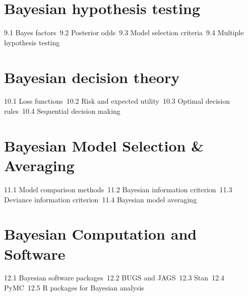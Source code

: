 \section{Bayesian hypothesis testing}
9.1 Bayes factors\
9.2 Posterior odds\
9.3 Model selection criteria\
9.4 Multiple hypothesis testing\
\section{Bayesian decision theory}
10.1 Loss functions\
10.2 Risk and expected utility\
10.3 Optimal decision rules\
10.4 Sequential decision making\
\section{Bayesian Model Selection \& Averaging}
11.1 Model comparison methods\
11.2 Bayesian information criterion\
11.3 Deviance information criterion\
11.4 Bayesian model averaging\
\section{Bayesian Computation and Software}
12.1 Bayesian software packages\
12.2 BUGS and JAGS\
12.3 Stan\
12.4 PyMC\
12.5 R packages for Bayesian analysis\
